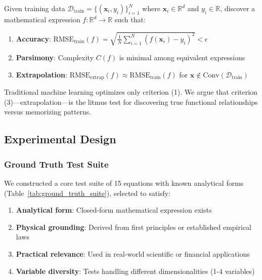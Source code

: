 \documentclass[twoside,11pt]{article}
\begin{document}
\begin{definition}
Given training data $\mathcal{D}_{\text{train}} = \{(\mathbf{x}_i, y_i)\}_{i=1}^N$ where $\mathbf{x}_i \in \mathbb{R}^d$ and $y_i \in \mathbb{R}$, discover a mathematical expression $f: \mathbb{R}^d \to \mathbb{R}$ such that:
\begin{enumerate}
    \item \textbf{Accuracy}: $\text{RMSE}_{\text{train}}(f) = \sqrt{\frac{1}{N}\sum_{i=1}^N (f(\mathbf{x}_i) - y_i)^2} < \epsilon$
    \item \textbf{Parsimony}: Complexity $C(f)$ is minimal among equivalent expressions
    \item \textbf{Extrapolation}: $\text{RMSE}_{\text{extrap}}(f) \approx \text{RMSE}_{\text{train}}(f)$ for $\mathbf{x} \notin \text{Conv}(\mathcal{D}_{\text{train}})$
\end{enumerate}
\end{definition}

Traditional machine learning optimizes only criterion (1). We argue that criterion (3)---extrapolation---is the litmus test for discovering true functional relationships versus memorizing patterns.

\subsection{Experimental Design}

\subsubsection{Ground Truth Test Suite}

We constructed a core test suite of 15 equations with known analytical forms (Table~\ref{tab:ground_truth_suite}), selected to satisfy:

\begin{enumerate}
    \item \textbf{Analytical form}: Closed-form mathematical expression exists
    \item \textbf{Physical grounding}: Derived from first principles or established empirical laws
    \item \textbf{Practical relevance}: Used in real-world scientific or financial applications
    \item \textbf{Variable diversity}: Tests handling different dimensionalities (1-4 variables)
\end{enumerate}
\end{document}
